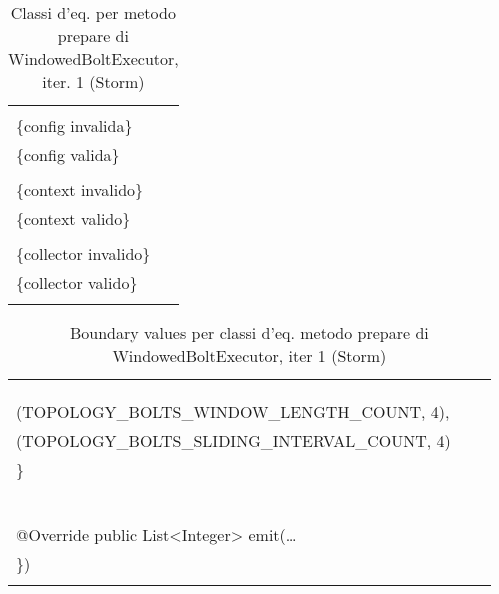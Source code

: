 \documentclass[10pt, a4paper]{article}
\newcommand{\Intmaketable}[4]{
	\begin{longtable}{#3}
	#4
	\caption{#2}
	\label{#1}
	\end{longtable}
}
\newcommand{\Intceqtable}[3]{
	\Intmaketable{#1}{#2}{|l|l|}{
	\hline
	\thead{Parametro formale} & \thead{Classi d'equivalenza} \\
	\hline
	\hline
	#3
	\hline}
}
\newcommand{\Intbvtable}[3]{
	\Intmaketable{#1}{#2}{|l|l|l|}{
	\hline
	\thead{Parametro formale} & \thead{Classe d'equivalenza} & \thead{Boundary value}\\
	\hline
	\hline
	#3
	\hline}
}
\newcommand{\Intceqcaption}[4]{Classi d'eq. per metodo #1 di #2, iter. #3 (#4)}
\newcommand{\Intbvcaption}[4]{Boundary values per classi d'eq. metodo #1 di #2, iter #3 (#4)}
\newcommand{\gettablelabel}[5]{table:#1:#2:#3:iter#4:proj#5}
\newcommand{\ceqtable}[5]{
	\Intceqtable{\gettablelabel{ceq}{#1}{#2}{#3}{#4}}
		{\Intceqcaption{#1}{#2}{#3}{#4}}
		{#5}
}
\newcommand{\bvtable}[5]{
	\Intbvtable{\gettablelabel{bv}{#1}{#2}{#3}{#4}}
		{\Intbvcaption{#1}{#2}{#3}{#4}}
		{#5}
}
\newcommand{\tcell}{\makecell[tl]}
\newcommand{\newtrow}{\\ \hline}
\def\storm{Storm}
\newcommand{\ceq}[1]{\{#1\}}
\begin{document}
	
	\ceqtable{prepare}{WindowedBoltExecutor}{1}{\storm}{
			\tcell{topoConf} &
			\tcell{\ceq{null}\\\ceq{config invalida}\\\ceq{config valida}}
		\newtrow
			\tcell{context} &
			\tcell{\ceq{null}\\\ceq{context invalido}\\\ceq{context valido}}
		\newtrow
			\tcell{collector} &
			\tcell{\ceq{null}\\\ceq{collector invalido}\\\ceq{collector valido}}
		\newtrow
	}
	
	\bvtable{prepare}{WindowedBoltExecutor}{1}{\storm}{
			\tcell{topoConf} &
			\tcell{\ceq{null}} &
			\tcell{null}
		\newtrow
			\tcell{topoConf} &
			\tcell{\ceq{config invalida}} &
			\tcell{Map\{\}}
		\newtrow
			\tcell{topoConf} &
			\tcell{\ceq{config valida}} &
			\tcell{Map\{\\\;\;(TOPOLOGY\_BOLTS\_WINDOW\_LENGTH\_COUNT, 4),\\\;\;(TOPOLOGY\_BOLTS\_SLIDING\_INTERVAL\_COUNT, 4)\\\}}
		\newtrow
			\tcell{context} &
			\tcell{\ceq{null}} &
			\tcell{null}
		\newtrow
			\tcell{context} &
			\tcell{\ceq{context valido}} &
			\tcell{mock(TopologyContext.class)}
		\newtrow
			\tcell{context} &
			\tcell{\ceq{context invalido}} &
			\tcell{new TopologyContext(null,\dots,null)}
		\newtrow
			\tcell{collector} &
			\tcell{\ceq{null}} &
			\tcell{null}
		\newtrow
			\tcell{collector} &
			\tcell{\ceq{collector invalido}} &
			\tcell{new OutputCollector(null)}
		\newtrow
			\tcell{collector} &
			\tcell{\ceq{collector valido}} &
			\tcell{new OutputCollector(new IOutputCollector() \{\\\;\;@Override public List<Integer> emit(\dots\\\})}
		\newtrow
	}
	
	\newpage
	
\end{document}
